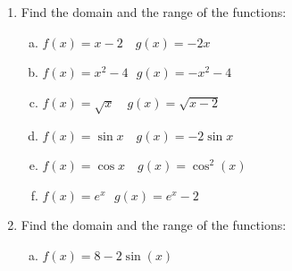 \documentclass[a4paper,12pt]{article}
\begin{document}

\begin{enumerate}
 
\item Find the domain and the range of the functions:
\begin{multicols}{2}
	\begin{enumerate}[(a)]
		\item $f( x )= x - 2$ \,\, $g( x )= -2 x$
		
		\item $f( x )= x^2 - 4$\,\, $g( x )= - x^2 - 4$
		
		
		
		\item $f( x )= \sqrt{x}$ \,\, $g( x )= \sqrt{x - 2}$
		
		
		
		\item $f( x ) =  \sin x$ \,\, $g( x ) =  -2 \sin x$
		
		\item $f( x ) =  \cos x$ \,\, $g( x ) =  \cos^2(x)$
		
		\item $f( x ) =  e^{x}$\,\, $g( x) =  e^{x}- 2$
		
		
		
	\end{enumerate}
\end{multicols}		
\item Find the domain and the range of the functions:
\begin{multicols}{2}
	\begin{enumerate}[(a)]
		\item $f(x) = 8 - 2 \sin(x)$ 	
		

\end{enumerate}
\end{multicols}
\end{enumerate}
\end{document}
